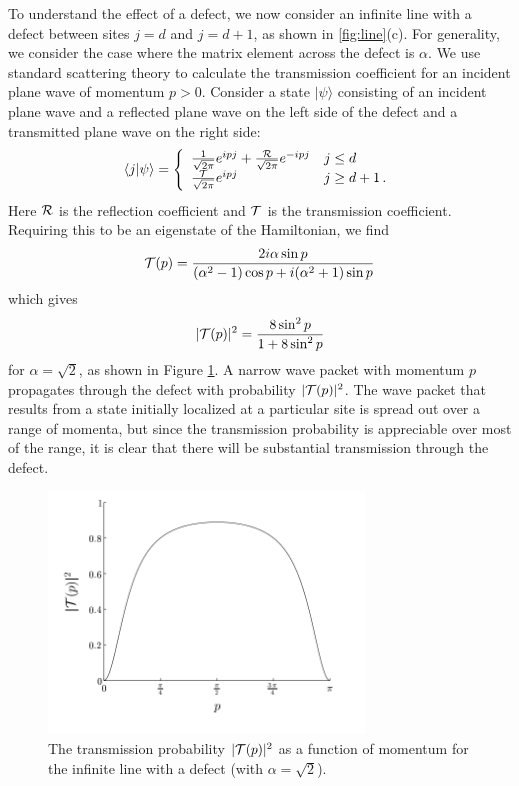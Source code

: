 \documentclass[aps,11pt,twoside,nofootinbib,tightenlines,superscriptaddress,preprintnumbers]{revtex4}
\makeatletter
\newcommand{\<}{\langle}
\renewcommand{\>}{\rangle}
\newcommand{\be}{\begin{equation}}
\newcommand{\ee}{\end{equation}}
\newcommand{\cond}[1]{\left\{\begin{array}{l@{~~~}l}#1\end{array}\right.}
\makeatother
\begin{document}
To understand the effect of a defect, we now consider an infinite line
with a defect between sites $j=d$ and $j=d+1$, as shown in
\ref{fig:line}(c).  For generality, we consider the case where the matrix
element across the defect is $\alpha$.  We use standard scattering theory
to calculate the transmission coefficient for an incident plane wave of
momentum $p>0$.  Consider a state $|\psi\>$ consisting of an incident
plane wave and a reflected plane wave on the left side of the defect and a
transmitted plane wave on the right side:
\be
  \<j|\psi\> = \cond{
  {1 \over \sqrt{2\pi}} e^{i p j}
  +{{\cal R} \over \sqrt{2\pi}} e^{-i p j} & j \le d \\
   {{\cal T} \over \sqrt{2\pi}} e^{i p j}  & j \ge d+1 \,.}
\ee
Here $\cal R$ is the reflection coefficient and $\cal T$ is the
transmission coefficient.  Requiring this to be an eigenstate of the
Hamiltonian, we find
\be
  {\cal T}(p) 
    = {2i \alpha \sin p \over (\alpha^2-1) \cos p + i (\alpha^2+1) \sin p}
\ee
which gives
\be
  |{\cal T}(p)|^2 
    = {8 \sin^2 p \over 1 + 8 \sin^2 p}
\ee
for $\alpha=\sqrt 2$, as shown in Figure \ref{fig:transmit}. A
narrow wave packet with momentum $p$ propagates through the defect
with probability $|{\cal T}(p)|^2$.  The wave packet that results from a
state initially localized at a particular site is spread out over a range
of momenta, but since the transmission probability is appreciable over
most of the range, it is clear that there will be substantial transmission
through the defect.

\begin{figure}
\includegraphics[width=3.3in]{transmit}
\caption{The transmission probability $|{\cal T}(p)|^2$ as a function of
momentum for the infinite line with a defect (with $\alpha=\sqrt 2$).}
\label{fig:transmit}
\end{figure}
\end{document}
